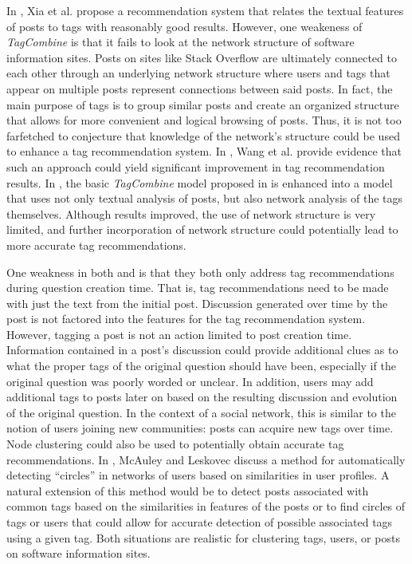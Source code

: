 \documentclass[11pt]{IEEEtran}
\begin{document}
In \cite{1}, Xia et al. propose a recommendation system that relates the textual features of posts to tags with reasonably good results. However, one weakeness of \textit{TagCombine} is that it fails to look at the network structure of software information sites. Posts on sites like Stack Overflow are ultimately connected to each other through an underlying network structure where users and tags that appear on multiple posts represent connections between said posts. In fact, the main purpose of tags is to group similar posts and create an organized structure that allows for more convenient and logical browsing of posts. Thus, it is not too farfetched to conjecture that knowledge of the network’s structure could be used to enhance a tag recommendation system. In \cite{5}, Wang et al. provide evidence that such an approach could yield significant improvement in tag recommendation results. In \cite{5}, the basic \textit{TagCombine} model proposed in \cite{1} is enhanced into a model that uses not only textual analysis of posts, but also network analysis of the tags themselves. Although results improved, the use of network structure is very limited, and further incorporation of network structure could potentially lead to more accurate tag recommendations.

One weakness in both \cite{1} and \cite{5} is that they both only address tag recommendations during question creation time. That is, tag recommendations need to be made with just the text from the initial post. Discussion generated over time by the post is not factored into the features for the tag recommendation system. However, tagging a post is not an action limited to post creation time.
Information contained in a post’s discussion could provide additional clues as to what the proper tags of the original question should have been, especially if the original question was poorly worded or unclear. In addition, users may add additional tags to posts later on based on the resulting discussion and evolution of the original question. In the context of a social network, this is similar to the notion of users joining new communities: posts can acquire new tags over time. Node clustering could also be used to potentially obtain accurate tag recommendations. In \cite{2}, McAuley and Leskovec discuss a method for automatically detecting ``circles'' in networks of users based on similarities in user profiles. A natural extension of this method would be to detect posts associated with common tags based on the similarities in features of the posts or to find circles of tags or users that could allow for accurate detection of possible associated tags using a given tag. Both situations are realistic for clustering tags, users, or posts on software information sites.
\end{document}
